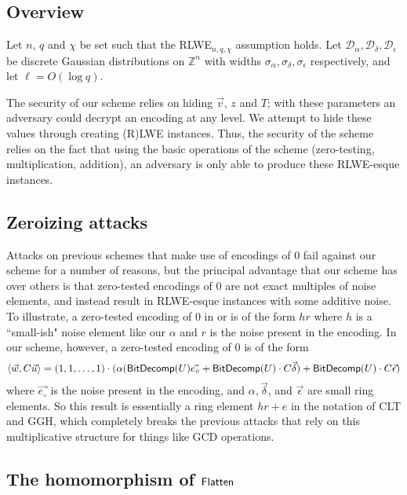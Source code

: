 \subsection{Overview}

Let $n$, $q$ and $\chi$ be set such that the RLWE$_{n,q,\chi}$ assumption holds.  Let $\mathcal{D}_\alpha, \mathcal{D}_\delta, \mathcal{D}_\epsilon$ be discrete Gaussian distributions on $\mathbb{Z}^n$ with widths $\sigma_\alpha, \sigma_\delta, \sigma_\epsilon$ respectively, and let $\ell = O(\log q)$.  

The security of our scheme relies on hiding $\vec{v}$, $z$ and $T$; with these parameters an adversary could decrypt an encoding at any level.  We attempt to hide these values through creating (R)LWE instances.  Thus, the security of the scheme relies on the fact that using the basic operations of the scheme (zero-testing, multiplication, addition), an adversary is only able to produce these RLWE-esque instances.  

\subsection{Zeroizing attacks}
Attacks on previous schemes \cite{chl,cgh,hj} that make use of encodings of 0 fail against our scheme for a number of reasons, but the principal advantage that our scheme has over others is that zero-tested encodings of $0$ are not exact multiples of noise elements, and instead result in RLWE-esque instances with some additive noise.  To illustrate, a zero-tested encoding of $0$ in \cite{clt} or \cite{ggh13a} is of the form $hr$ where $h$ is a ``small-ish" noise element like our $\alpha$ and $r$ is the noise present in the encoding.  In our scheme, however, a zero-tested encoding of $0$ is of the form
$$\left<\vec{w}, C \vec{u}\right> = (1,1,\ldots, 1)\cdot(\alpha (\mathsf{BitDecomp}(U)\vec{e_{\circ}} + \mathsf{BitDecomp}(U)\cdot C\vec{\delta}) + \mathsf{BitDecomp}(U)\cdot C\vec{\epsilon})$$
where $\vec{e_{\circ}}$ is the noise present in the encoding, and $\alpha, \vec{\delta}$, and $\vec{\epsilon}$ are small ring elements.  So this result is essentially a ring element $hr + e$ in the notation of CLT and GGH, which completely breaks the previous attacks that rely on this multiplicative structure for things like GCD operations. 

\subsection{The homomorphism of $\mathsf{Flatten}$}

